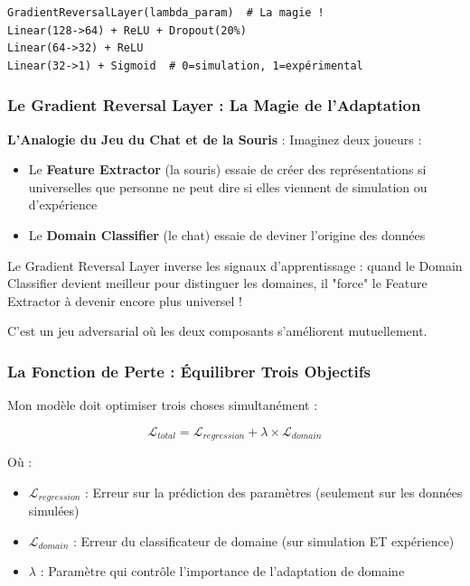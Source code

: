 \documentclass[11pt,a4paper]{article}
\begin{document}
\begin{lstlisting}[caption=Classificateur de domaine avec GRL]
GradientReversalLayer(lambda_param)  # La magie !
Linear(128->64) + ReLU + Dropout(20%)
Linear(64->32) + ReLU
Linear(32->1) + Sigmoid  # 0=simulation, 1=expérimental
\end{lstlisting}

\subsubsection{Le Gradient Reversal Layer : La Magie de l'Adaptation}

\begin{warningbox}
\textbf{L'Analogie du Jeu du Chat et de la Souris} : Imaginez deux joueurs :
\begin{itemize}
    \item Le \textbf{Feature Extractor} (la souris) essaie de créer des représentations si universelles que personne ne peut dire si elles viennent de simulation ou d'expérience
    \item Le \textbf{Domain Classifier} (le chat) essaie de deviner l'origine des données
\end{itemize}

Le Gradient Reversal Layer inverse les signaux d'apprentissage : quand le Domain Classifier devient meilleur pour distinguer les domaines, il "force" le Feature Extractor à devenir encore plus universel !

C'est un jeu adversarial où les deux composants s'améliorent mutuellement.
\end{warningbox}

\subsubsection{La Fonction de Perte : Équilibrer Trois Objectifs}

Mon modèle doit optimiser trois choses simultanément :

\begin{equation}
\mathcal{L}_{total} = \mathcal{L}_{regression} + \lambda \times \mathcal{L}_{domain}
\end{equation}

Où :
\begin{itemize}
    \item $\mathcal{L}_{regression}$ : Erreur sur la prédiction des paramètres (seulement sur les données simulées)
    \item $\mathcal{L}_{domain}$ : Erreur du classificateur de domaine (sur simulation ET expérience)
    \item $\lambda$ : Paramètre qui contrôle l'importance de l'adaptation de domaine
\end{itemize}
\end{document}
